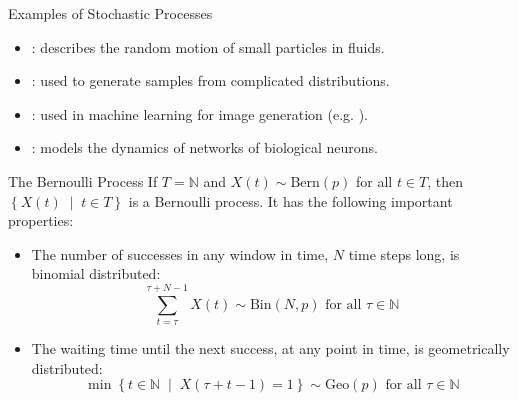 \documentclass[10pt]{beamer}
\begin{document}
\begin{frame}[fragile]{Examples of Stochastic Processes}
\begin{itemize}[<+->]
    \item \href{https://en.wikipedia.org/wiki/Brownian_motion}{\color{mLightBrown}{Brownian motion}}: describes the random motion of small particles in fluids.
    \item \href{https://en.wikipedia.org/wiki/Markov_chain_Monte_Carlo}{\color{mLightBrown}{Markov chain Monte Carlo}}: used to generate samples from complicated distributions.
    \item \href{https://en.wikipedia.org/wiki/Diffusion_process}{\color{mLightBrown}{Diffusion processes}}: used in machine learning for image generation (e.g. \href{https://en.wikipedia.org/wiki/Stable_Diffusion}{\color{mLightBrown}{Stable Diffusion}}).
    \item \href{https://en.wikipedia.org/wiki/Galves%E2%80%93L%C3%B6cherbach_model}{\color{mLightBrown}{Galves–L\"ocherbach model}}: models the dynamics of networks of biological neurons.
\end{itemize}
\end{frame}

\begin{frame}[fragile]{The Bernoulli Process}
If \(T = \mathbb{N}\) and \(X\left(t\right) \sim \textrm{Bern}\left(p\right)\) for all \(t \in T\), then \(\left\{X\left(t\right) \;\middle|\; t \in T\right\}\) is a Bernoulli process. It has the following important properties:
\begin{itemize}[<+->]
    \item The number of successes in any window in time, \(N\) time steps long, is binomial distributed:
    \begin{equation*}
        \sum_{t = \tau}^{\tau + N - 1} X\left(t\right) \sim \textrm{Bin}\left(N, p\right) \textrm{ for all } \tau \in \mathbb{N}
    \end{equation*}
    \item The waiting time until the next success, at any point in time, is geometrically distributed:
    \begin{equation*}
        \min\left\{t \in \mathbb{N} \;\middle|\; X\left(\tau + t - 1\right) = 1\right\} \sim \textrm{Geo}\left(p\right) \textrm{ for all } \tau \in \mathbb{N}
    \end{equation*}
\end{itemize}
\end{frame}
\end{document}
